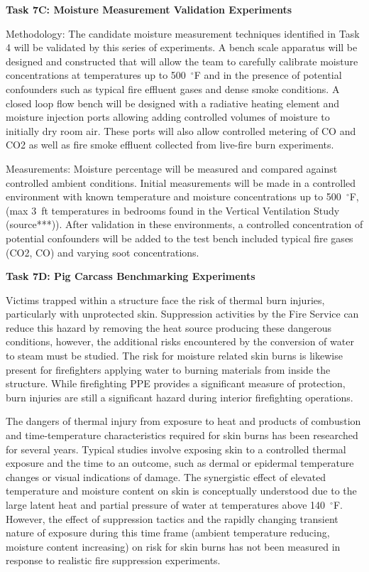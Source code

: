 \documentclass{article}
\begin{document}
\begin{itemize}
\subitem \bf{Task 7C:  Moisture Measurement Validation Experiments}
\normalfont
\vspace*{\baselineskip}

Methodology: The candidate moisture measurement techniques identified in Task 4 will be validated by this series of experiments. A bench scale apparatus will be designed and constructed that will allow the team to carefully calibrate moisture concentrations at temperatures up to 500~$^{\circ}$F and in the presence of potential confounders such as typical fire effluent gases and dense smoke conditions. A closed loop flow bench will be designed with a radiative heating element and moisture injection ports allowing adding controlled volumes of moisture to initially dry room air. These ports will also allow controlled metering of CO and CO2 as well as fire smoke effluent collected from live-fire burn experiments.

Measurements: Moisture percentage will be measured and compared against controlled ambient conditions. Initial measurements will be made in a controlled environment with known temperature and moisture concentrations up to 500~$^{\circ}$F, (max 3~ft temperatures in bedrooms found in the Vertical Ventilation Study (source***)). After validation in these environments, a controlled concentration of potential confounders will be added to the test bench included typical fire gases (CO2, CO) and varying soot concentrations.
\vspace*{\baselineskip}

\subitem \bf{Task 7D:  Pig Carcass Benchmarking Experiments}
\normalfont
\vspace*{\baselineskip}

Victims trapped within a structure face the risk of thermal burn injuries, particularly with unprotected skin. Suppression activities by the Fire Service can reduce this hazard by removing the heat source producing these dangerous conditions, however, the additional risks encountered by the conversion of water to steam must be studied. The risk for moisture related skin burns is likewise present for firefighters applying water to burning materials from inside the structure. While firefighting PPE provides a significant measure of protection, burn injuries are still a significant hazard during interior firefighting operations.

The dangers of thermal injury from exposure to heat and products of combustion and time-temperature characteristics required for skin burns has been researched for several years. Typical studies involve exposing skin to a controlled thermal exposure and the time to an outcome, such as dermal or epidermal temperature changes or visual indications of damage. The synergistic effect of elevated temperature and moisture content on skin is conceptually understood due to the large latent heat and partial pressure of water at temperatures above 140~$^{\circ}$F. However, the effect of suppression tactics and the rapidly changing transient nature of exposure during this time frame (ambient temperature reducing, moisture content increasing) on risk for skin burns has not been measured in response to realistic fire suppression experiments. 


\end{itemize}
\end{document}
